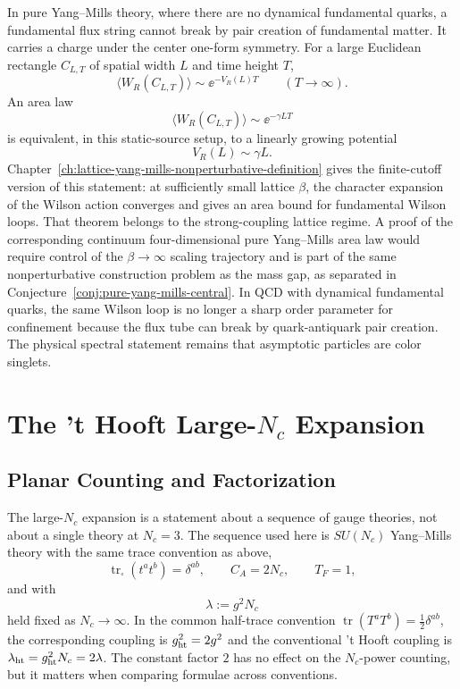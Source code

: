 In pure Yang--Mills theory, where there are no dynamical fundamental quarks,
a fundamental flux string cannot break by pair creation of fundamental matter.
It carries a charge under the center one-form symmetry.  For a large Euclidean
rectangle \(C_{L,T}\) of spatial width \(L\) and time height \(T\),
\begin{equation}
  \langle W_R(C_{L,T})\rangle
  \sim
  \ee^{-V_R(L)T}
  \qquad (T\to\infty).
  \label{eq:qcd-wilson-loop-static-potential}
\end{equation}
An area law
\[
  \langle W_R(C_{L,T})\rangle\sim\ee^{-\gamma LT}
\]
is equivalent, in this static-source setup, to a linearly growing potential
\[
  V_R(L)\sim\gamma L .
\]
Chapter~\ref{ch:lattice-yang-mills-nonperturbative-definition} gives the
finite-cutoff version of this statement: at sufficiently small lattice
\(\beta\), the character expansion of the Wilson action converges and gives an
area bound for fundamental Wilson loops.  That theorem belongs to the
strong-coupling lattice regime.  A proof of the corresponding continuum
four-dimensional pure Yang--Mills area law would require control of the
\(\beta\to\infty\) scaling trajectory and is part of the same
nonperturbative construction problem as the mass gap, as separated in
Conjecture~\ref{conj:pure-yang-mills-central}.
In QCD with dynamical fundamental quarks, the same Wilson loop is no longer a
sharp order parameter for confinement because the flux tube can break by
quark-antiquark pair creation.  The physical spectral statement remains that
asymptotic particles are color singlets.

\section{\texorpdfstring{The 't Hooft Large-\(N_c\) Expansion}{The 't Hooft Large-Nc Expansion}}

\subsection{Planar Counting and Factorization}
\label{subsec:qcd-large-n-planar-counting-factorization}

The large-\(N_c\) expansion is a statement about a sequence of gauge theories,
not about a single theory at \(N_c=3\).  The sequence used here is
\(SU(N_c)\) Yang--Mills theory with the same trace convention as above,
\[
  \operatorname{tr}_{\square}(t^at^b)=\delta^{ab},
  \qquad
  C_A=2N_c,\qquad T_F=1,
\]
and with
\begin{equation}
  \lambda:=g^2N_c
  \label{eq:qcd-large-n-lambda-definition}
\end{equation}
held fixed as \(N_c\to\infty\).  In the common half-trace convention
\(\operatorname{tr}(T^aT^b)=\frac12\delta^{ab}\), the corresponding coupling
is \(g_{\rm ht}^2=2g^2\) and the conventional 't Hooft coupling is
\(\lambda_{\rm ht}=g_{\rm ht}^2N_c=2\lambda\).  The constant factor \(2\)
has no effect on the \(N_c\)-power counting, but it matters when comparing
formulae across conventions.

